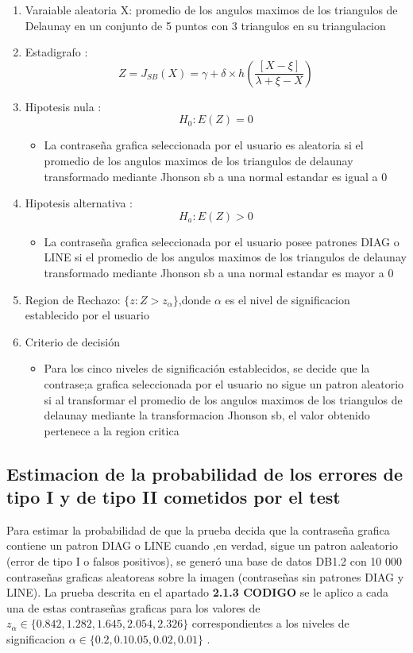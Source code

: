 \documentclass[12pt]{report}
\begin{document}
\begin{enumerate}
	\item Varaiable aleatoria X: promedio de los angulos maximos de los triangulos de Delaunay en un conjunto de 5 puntos con 3 triangulos en su triangulacion
	\item Estadigrafo : \[
	Z= J_{SB}(X) = \gamma + \delta \times h\left(\frac{[X - \xi]}{\lambda + \xi - X}\right)
	\]

	\item Hipotesis nula : \[H_0:E(Z)=0\]
	\begin{itemize}
		\item La contraseña grafica seleccionada por el usuario es aleatoria si el promedio de los angulos maximos de los triangulos de delaunay  transformado mediante Jhonson sb a una normal estandar es igual a 0
	\end{itemize}
	
	
	\item Hipotesis alternativa : \[H_a:E(Z)>0\]
			\begin{itemize}
			\item La contraseña grafica seleccionada por el usuario posee patrones DIAG o LINE  si el promedio de los angulos maximos de los triangulos de delaunay  transformado mediante Jhonson sb a una normal estandar es mayor a 0
		\end{itemize}
	
	\item  Region de Rechazo: $\{z:Z>z_\alpha\}$,donde $\alpha$ es el nivel de significacion establecido por el usuario 
	
	\item Criterio de decisión
	\begin{itemize}
		\item Para los cinco niveles de significación establecidos, se decide que la contrase;a grafica seleccionada por el usuario no sigue un patron aleatorio si al transformar el promedio de los angulos maximos de los triangulos de delaunay mediante la transformacion Jhonson sb, el valor obtenido pertenece a la region critica 
	\end{itemize}
	\end{enumerate}	 
	
\subsection{Estimacion de la probabilidad de los errores de tipo I y de tipo II  cometidos por el test}	 

	Para estimar la probabilidad de que la prueba decida que la contraseña grafica contiene un patron DIAG o LINE cuando ,en verdad, sigue un patron aaleatorio (error de tipo I o falsos positivos), se generó una base de datos DB1.2 con 10 000 contraseñas graficas aleatoreas sobre la imagen (contraseñas sin patrones DIAG y LINE). La prueba descrita en el apartado \textbf{2.1.3 CODIGO} se le aplico a cada una de estas contraseñas graficas para los valores de $z_\alpha \in \{0.842, 1.282, 1.645, 2.054, 2.326\}$ correspondientes a los niveles de significacion $\alpha \in \{0.2, 0.1 0.05, 0.02 , 0.01\}$ .
	
\end{document}
